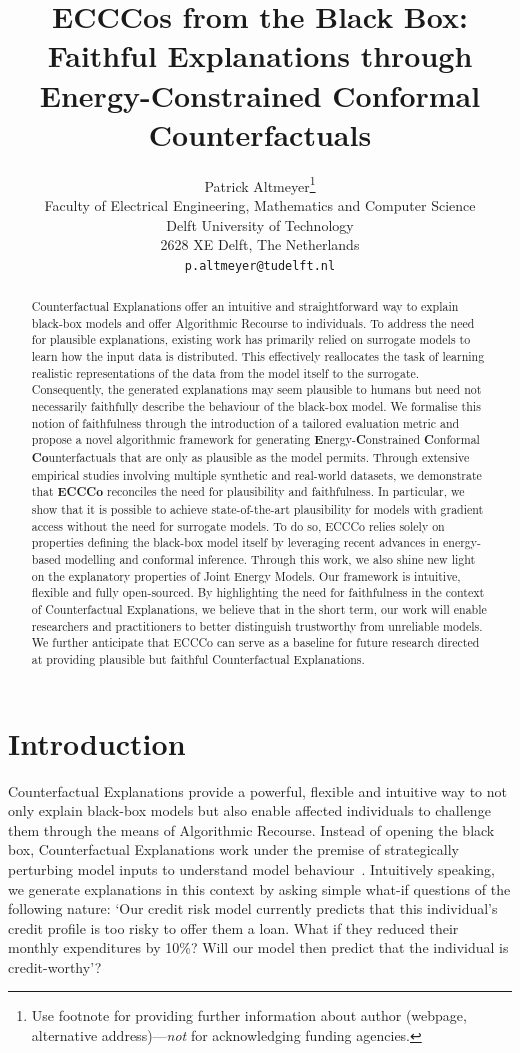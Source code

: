 \documentclass{article}
\title{ECCCos from the Black Box:\\
Faithful Explanations through\\
Energy-Constrained Conformal Counterfactuals}
\author{%
  Patrick Altmeyer\thanks{Use footnote for providing further information
    about author (webpage, alternative address)---\emph{not} for acknowledging
    funding agencies.} \\
  Faculty of Electrical Engineering, Mathematics and Computer Science\\
  Delft University of Technology\\
  2628 XE Delft, The Netherlands \\
  \texttt{p.altmeyer@tudelft.nl} \\
}
\begin{document}
\maketitle


\begin{abstract}
  Counterfactual Explanations offer an intuitive and straightforward way to explain black-box models and offer Algorithmic Recourse to individuals. To address the need for plausible explanations, existing work has primarily relied on surrogate models to learn how the input data is distributed. This effectively reallocates the task of learning realistic representations of the data from the model itself to the surrogate. Consequently, the generated explanations may seem plausible to humans but need not necessarily faithfully describe the behaviour of the black-box model. We formalise this notion of faithfulness through the introduction of a tailored evaluation metric and propose a novel algorithmic framework for generating \textbf{E}nergy-\textbf{C}onstrained \textbf{C}onformal \textbf{Co}unterfactuals that are only as plausible as the model permits. Through extensive empirical studies involving multiple synthetic and real-world datasets, we demonstrate that \textbf{ECCCo} reconciles the need for plausibility and faithfulness. In particular, we show that it is possible to achieve state-of-the-art plausibility for models with gradient access without the need for surrogate models. To do so, ECCCo relies solely on properties defining the black-box model itself by leveraging recent advances in energy-based modelling and conformal inference. Through this work, we also shine new light on the explanatory properties of Joint Energy Models. Our framework is intuitive, flexible and fully open-sourced. By highlighting the need for faithfulness in the context of Counterfactual Explanations, we believe that in the short term, our work will enable researchers and practitioners to better distinguish trustworthy from unreliable models. We further anticipate that ECCCo can serve as a baseline for future research directed at providing plausible but faithful Counterfactual Explanations. 
\end{abstract}

\section{Introduction}\label{intro}

Counterfactual Explanations provide a powerful, flexible and intuitive way to not only explain black-box models but also enable affected individuals to challenge them through the means of Algorithmic Recourse. Instead of opening the black box, Counterfactual Explanations work under the premise of strategically perturbing model inputs to understand model behaviour~\citep{wachter2017counterfactual}. Intuitively speaking, we generate explanations in this context by asking simple what-if questions of the following nature: `Our credit risk model currently predicts that this individual's credit profile is too risky to offer them a loan. What if they reduced their monthly expenditures by 10\%? Will our model then predict that the individual is credit-worthy'? 
\end{document}
